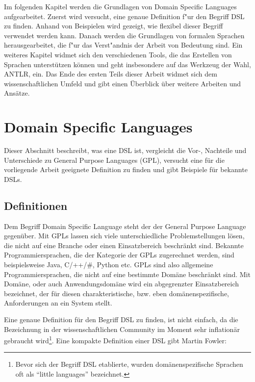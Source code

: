Im folgenden Kapitel werden die Grundlagen von Domain Specific Languages aufgearbeitet. 
Zuerst wird versucht, eine genaue Definition f"ur den Begriff DSL zu finden. 
Anhand von Beispielen wird gezeigt, wie flexibel dieser Begriff verwendet werden kann. 
Danach werden die Grundlagen von formalen Sprachen herausgearbeitet, die f"ur das Verst"andnis der Arbeit von Bedeutung sind. 
Ein weiteres Kapitel widmet sich den verschiedenen Tools, die das Erstellen von Sprachen unterstützen können und geht insbesondere auf das Werkzeug der Wahl, ANTLR, ein.
Das Ende des ersten Teils dieser Arbeit widmet sich dem wissenschaftlichen Umfeld und gibt einen Überblick über weitere Arbeiten und Ansätze.



\newpage

\chapter{Domain Specific Languages}
\label{chapter_dsl}

Dieser Abschnitt beschreibt, was eine DSL ist, vergleicht die Vor-, Nachteile und Unterschiede zu General Purpose Languages (GPL), versucht eine für die vorliegende Arbeit geeignete Definition zu finden und gibt Beispiele für bekannte DSLs.

\section{Definitionen}

Dem Begriff Domain Specific Language steht der der General Purpose Language gegenüber. Mit GPLs lassen sich viele unterschiedliche Problemstellungen lösen, die nicht auf eine Branche oder einen Einsatzbereich beschränkt sind. Bekannte Programmiersprachen, die der Kategorie der GPLs zugerechnet werden, sind beispielsweise Java, C/++/\#, Python etc. GPLs sind also allgemeine Programmiersprachen, die nicht auf eine bestimmte Domäne beschränkt sind. Mit Domäne, oder auch Anwendungsdomäne wird ein abgegrenzter Einsatzbereich bezeichnet, der für diesen charakteristische, bzw. eben domänenspezifische, Anforderungen an ein System stellt.

Eine genaue Definition für den Begriff DSL zu finden, ist nicht einfach, da die Bezeichnung in der wissenschaftlichen Community im Moment sehr inflationär gebraucht wird\footnote{Bevor sich der Begriff DSL etablierte, wurden domänenspezifische Sprachen oft als ``little languages'' bezeichnet\cite{VaDe00}.}. Eine kompakte Definition einer DSL gibt Martin Fowler:

